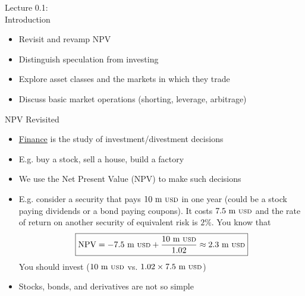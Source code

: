\documentclass{beamer}
\begin{document}
\begin{frame}
\begin{center}
\Huge Lecture 0.1: \\
Introduction
\end{center}
\end{frame}

\begin{frame}{}
	\begin{itemize}
		\item Revisit and revamp NPV
		\item Distinguish speculation from investing
		\item Explore asset classes and the markets in which they trade
		\item Discuss basic market operations (shorting, leverage, arbitrage)
	\end{itemize}
\end{frame}

\begin{frame}
\begin{center}
\Huge NPV Revisited
\end{center}
\end{frame}

\begin{frame}{}
	\begin{itemize}
		\item \underline{Finance} is the study of investment/divestment decisions
		\item E.g. buy a stock, sell a house, build a factory
		\item We use the Net Present Value (NPV) to make such decisions 
		\item E.g. consider a security that pays $10\text{ m {\scriptsize USD}}$ in one year (could be a stock paying dividends or a bond paying coupons). It costs $7.5\text{ m {\scriptsize USD}}$ and the rate of return on another security of equivalent risk is $2\%$. You know that 
		\begin{equation}
			\boxed{
			\text{NPV}=-7.5\text{ m {\scriptsize USD}}+\frac{10\text{ m {\scriptsize USD}}}{1.02}\approx 2.3\text{ m {\scriptsize USD}}
			}
		\end{equation}
		You should invest ($10\text{ m {\scriptsize USD}}$ vs. $1.02\times7.5\text{ m {\scriptsize USD}}$) 
		\item Stocks, bonds, and derivatives are not so simple
	\end{itemize}
\end{frame}
\end{document}
